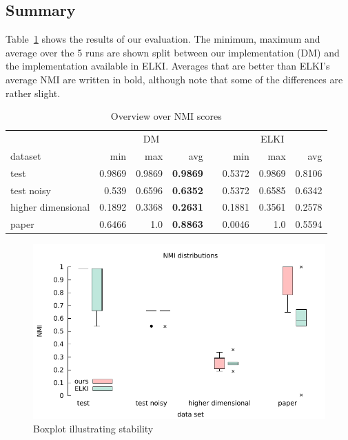 \documentclass[english]{scrartcl}
\begin{document}
\subsection{Summary}

Table~\ref{tab:overview} shows the results of our evaluation. The minimum,
maximum and average over the 5 runs are shown split between our implementation
(DM) and the implementation available in ELKI. Averages that are better than
ELKI's average NMI are written in bold, although note that some of the differences
are rather slight.

\begin{table}[]\centering
  \begin{tabular}{lrrrcrrr}\toprule
     & \multicolumn{3}{c}{DM} & \phantom{abc} & \multicolumn{3}{c}{ELKI}\\
    dataset & min & max & avg & & min & max & avg\\ \midrule
    test & 0.9869 & 0.9869 & \textbf{0.9869} & & 0.5372 & 0.9869 & 0.8106\\
    test noisy & 0.539 & 0.6596 & \textbf{0.6352} & & 0.5372 & 0.6585 & 0.6342\\
    higher dimensional & 0.1892 & 0.3368 & \textbf{0.2631} & & 0.1881 & 0.3561 & 0.2578\\
    paper & 0.6466 & 1.0 & \textbf{0.8863} & & 0.0046 & 1.0 & 0.5594\\
  \bottomrule
  \end{tabular}
  \caption{Overview over NMI scores}
  \label{tab:overview}
\end{table}


\begin{figure}[t!]
    \centering
    \includegraphics[width=\textwidth]{img/boxplt}
    \caption{Boxplot illustrating stability}
    \label{fig:box}
\end{figure}
\end{document}
